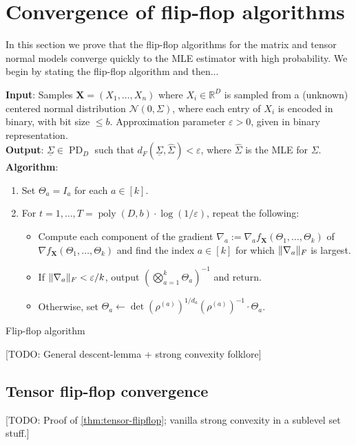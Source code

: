 \documentclass{article}
\DeclareMathOperator{\poly}{poly}
\DeclarePairedDelimiter{\norm}{\lVert}{\rVert}
\newcommand{\R}{{\mathbb{R}}}
\renewcommand{\vec}{\bm}
\newcommand\eps{\varepsilon}
\newcommand\cN{\mathcal{N}}
\newcommand\PD{\operatorname{PD}}
\newcommand{\TODO}[1]{{\color{blue}[TODO: #1]}}
\begin{document}
\section{Convergence of flip-flop algorithms}

In this section we prove that the flip-flop algorithms for the matrix and tensor normal models converge quickly to the MLE estimator with high probability. We begin by stating the flip-flop algorithm and then... 

\begin{Algorithm}
\textbf{Input}: Samples $\vec{X} = (X_1, \ldots, X_n)$ where $X_i \in \R^D$ is sampled from a (unknown) centered normal distribution $\cN(0, \Sigma)$, where each entry of $X_i$ is encoded in binary, with bit size $\le b$. Approximation parameter $\eps > 0$, given in binary representation. \\[.3ex]

\textbf{Output}: $\underline{\Sigma} \in \PD_D$ such that $d_F(\underline{\Sigma}, \hat{\Sigma}) < \eps$, where $\hat{\Sigma}$ is the MLE for $\Sigma$. \\[.3ex]

\textbf{Algorithm}:
\begin{enumerate}
\item\label{it:flip-flop step 1} Set $\Theta_a = I_a$ for each $a \in [k]$.
\item\label{it:flip-flop step 2} For $t=1,\dots,T = \poly(D, b) \cdot \log(1/\eps)$, repeat the following:
\begin{itemize}
\item Compute each component of the gradient $\nabla_a := \nabla_a f_{\vec X}(\Theta_1, \ldots, \Theta_k)$ of $\nabla f_{\vec X}(\Theta_1, \ldots, \Theta_k)$ and find the index $a \in [k]$ for which $\norm{\nabla_a}_F$ is largest. 
\item
If $\norm{\nabla_a}_F < \eps/k$, output $\left( \bigotimes_{a =1}^k \Theta_a \right)^{-1}$ and return.
\item Otherwise, set $\Theta_a \leftarrow \det(\rho^{(a)})^{1/d_a} (\rho^{(a)})^{-1} \cdot \Theta_a$.
\end{itemize}
\end{enumerate}
\caption{Flip-flop algorithm}\label{alg:flip-flop}
\end{Algorithm}

\TODO{General descent-lemma + strong convexity folklore}
\subsection{Tensor flip-flop convergence}
\TODO{Proof of \cref{thm:tensor-flipflop}; vanilla strong convexity in a sublevel set stuff.}
\end{document}
